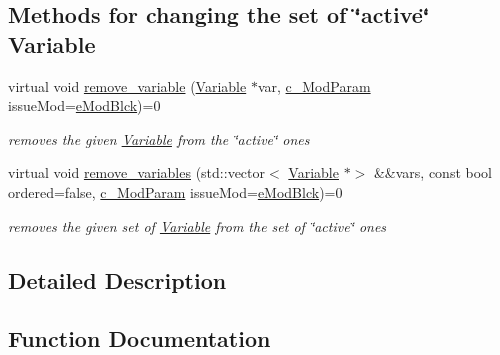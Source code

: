 \subsection*{Methods for changing the set of \char`\"{}active\char`\"{} Variable}
\begin{DoxyCompactItemize}
\item 
virtual void \mbox{\hyperlink{group___thin_var_dep_interface___c_l_a_s_s_e_s_gad6726141a0cbe6a0410a2b396809dade}{remove\+\_\+variable}} (\mbox{\hyperlink{class_s_m_spp__di__unipi__it_1_1_variable}{Variable}} $\ast$var, \mbox{\hyperlink{group___modification___t_y_p_e_s_ga544246d8c462e9a2d817c2c30797968f}{c\+\_\+\+Mod\+Param}} issue\+Mod=\mbox{\hyperlink{group___modification___t_y_p_e_s_gga48fddcdd03a03f49b7e389ca1ed938d4a21b14b26b1c0093a0905f6fc010bad29}{e\+Mod\+Blck}})=0
\begin{DoxyCompactList}\small\item\em removes the given \mbox{\hyperlink{class_s_m_spp__di__unipi__it_1_1_variable}{Variable}} from the \char`\"{}active\char`\"{} ones \end{DoxyCompactList}\item 
virtual void \mbox{\hyperlink{group___thin_var_dep_interface___c_l_a_s_s_e_s_ga4f21d262d25ed93ccc289134f2618ba9}{remove\+\_\+variables}} (std\+::vector$<$ \mbox{\hyperlink{class_s_m_spp__di__unipi__it_1_1_variable}{Variable}} $\ast$$>$ \&\&vars, const bool ordered=false, \mbox{\hyperlink{group___modification___t_y_p_e_s_ga544246d8c462e9a2d817c2c30797968f}{c\+\_\+\+Mod\+Param}} issue\+Mod=\mbox{\hyperlink{group___modification___t_y_p_e_s_gga48fddcdd03a03f49b7e389ca1ed938d4a21b14b26b1c0093a0905f6fc010bad29}{e\+Mod\+Blck}})=0
\begin{DoxyCompactList}\small\item\em removes the given set of \mbox{\hyperlink{class_s_m_spp__di__unipi__it_1_1_variable}{Variable}} from the set of \char`\"{}active\char`\"{} ones \end{DoxyCompactList}\end{DoxyCompactItemize}


\subsection{Detailed Description}


\subsection{Function Documentation}
\mbox{\label{group___thin_var_dep_interface___c_l_a_s_s_e_s_ga79162df6cbf36b4997db545dc30969e2}} 
